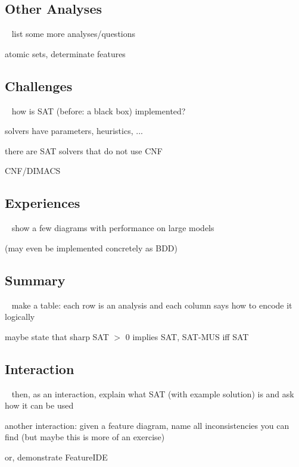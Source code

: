 \subsection{Other Analyses}
\begin{frame}{~}
    list some more analyses/questions

    atomic sets, determinate features
\end{frame}

\subsection{Challenges}
\begin{frame}{~}
    how is SAT (before: a black box) implemented?

    solvers have parameters, heuristics, ...

    there are SAT solvers that do not use CNF

    CNF/DIMACS
\end{frame}

\subsection{Experiences} %
\begin{frame}{~}
    show a few diagrams with performance on large models

    (may even be implemented concretely as BDD)
\end{frame}

\subsection{Summary}
\begin{frame}{~}
    make a table: each row is an analysis and each column says how to encode it logically

    maybe state that sharp SAT $>$ 0 implies SAT, SAT-MUS iff SAT
\end{frame}

\subsection{Interaction}
\begin{frame}{~}
    then, as an interaction, explain what SAT (with example solution) is and ask how it can be used

    another interaction: given a feature diagram, name all inconsistencies you can find (but maybe this is more of an exercise)

    or, demonstrate FeatureIDE
\end{frame}

